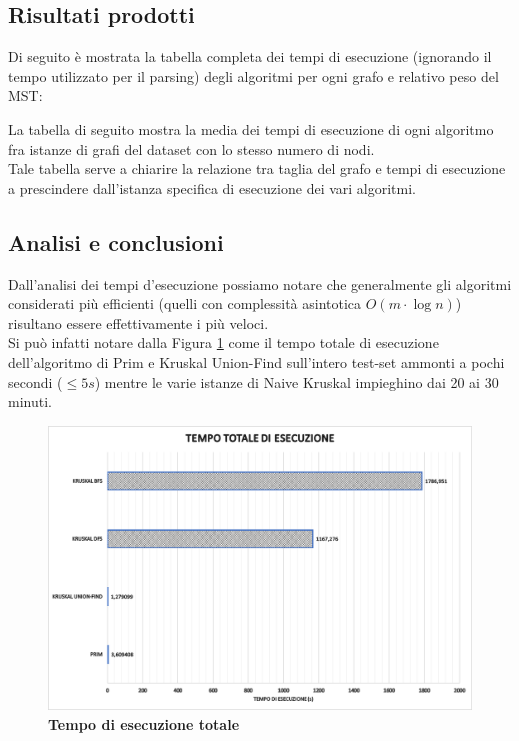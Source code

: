 \documentclass[]{article}
\begin{document}
\subsection{Risultati prodotti}
\begin{flushleft}
Di seguito è mostrata la tabella completa dei tempi di esecuzione (ignorando il tempo utilizzato per il parsing) degli algoritmi per ogni grafo e relativo peso del MST: 


La tabella di seguito mostra la media dei tempi di esecuzione di ogni algoritmo fra istanze di grafi del dataset con lo stesso numero di nodi.\\
Tale tabella serve a chiarire la relazione tra taglia del grafo e tempi di esecuzione a prescindere dall'istanza specifica di esecuzione dei vari algoritmi.

\newpage
\subsection{Analisi e conclusioni}
Dall'analisi dei tempi d'esecuzione possiamo notare che generalmente gli algoritmi considerati più efficienti (quelli con complessità asintotica $O(m\cdot\log n)$) risultano essere effettivamente i più veloci.\\
Si può infatti notare dalla Figura \ref{total} come il tempo totale di esecuzione dell'algoritmo di Prim e Kruskal Union-Find sull'intero test-set ammonti a pochi secondi ($\leq 5 s$) mentre le varie istanze di Naive Kruskal impieghino dai 20 ai 30 minuti.
\begin{figure}[H]
	\centering
	\includegraphics[width=\textwidth,height=\textheight,keepaspectratio]{grafo_costo_totale.png}
	\caption{\textbf{Tempo di esecuzione totale}}
	\label{total}
\end{figure}


\end{flushleft}
\end{document}
